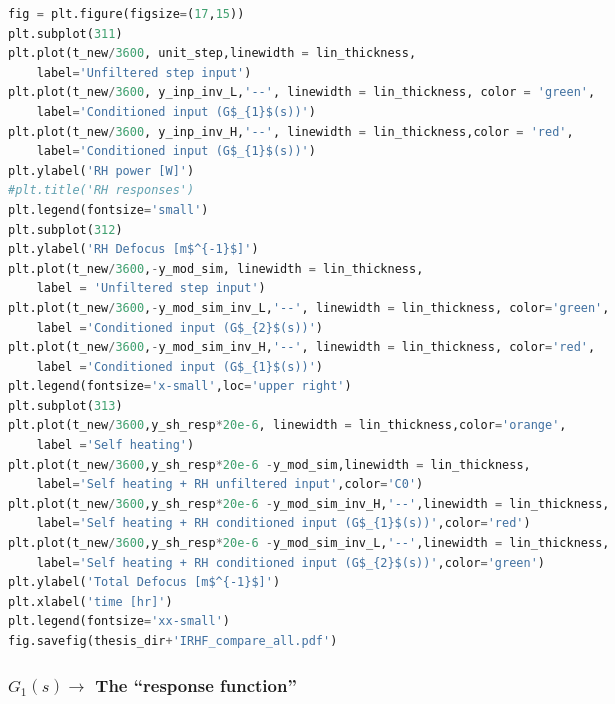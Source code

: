 
\begin{spacing}{1.2} \begin{lstlisting}[frame=single,language=Python]
fig = plt.figure(figsize=(17,15))
plt.subplot(311)
plt.plot(t_new/3600, unit_step,linewidth = lin_thickness,
    label='Unfiltered step input')
plt.plot(t_new/3600, y_inp_inv_L,'--', linewidth = lin_thickness, color = 'green',
    label='Conditioned input (G$_{1}$(s))')
plt.plot(t_new/3600, y_inp_inv_H,'--', linewidth = lin_thickness,color = 'red', 
    label='Conditioned input (G$_{1}$(s))')
plt.ylabel('RH power [W]')
#plt.title('RH responses')
plt.legend(fontsize='small')
plt.subplot(312)
plt.ylabel('RH Defocus [m$^{-1}$]')
plt.plot(t_new/3600,-y_mod_sim, linewidth = lin_thickness,
    label = 'Unfiltered step input')
plt.plot(t_new/3600,-y_mod_sim_inv_L,'--', linewidth = lin_thickness, color='green',
    label ='Conditioned input (G$_{2}$(s))')
plt.plot(t_new/3600,-y_mod_sim_inv_H,'--', linewidth = lin_thickness, color='red',
    label ='Conditioned input (G$_{1}$(s))')
plt.legend(fontsize='x-small',loc='upper right')
plt.subplot(313)
plt.plot(t_new/3600,y_sh_resp*20e-6, linewidth = lin_thickness,color='orange',
    label ='Self heating')
plt.plot(t_new/3600,y_sh_resp*20e-6 -y_mod_sim,linewidth = lin_thickness,
    label='Self heating + RH unfiltered input',color='C0')
plt.plot(t_new/3600,y_sh_resp*20e-6 -y_mod_sim_inv_H,'--',linewidth = lin_thickness,
    label='Self heating + RH conditioned input (G$_{1}$(s))',color='red')
plt.plot(t_new/3600,y_sh_resp*20e-6 -y_mod_sim_inv_L,'--',linewidth = lin_thickness,
    label='Self heating + RH conditioned input (G$_{2}$(s))',color='green')
plt.ylabel('Total Defocus [m$^{-1}$]')
plt.xlabel('time [hr]')
plt.legend(fontsize='xx-small')
fig.savefig(thesis_dir+'IRHF_compare_all.pdf')
\end{lstlisting} \end{spacing}


\subsubsection*{\texorpdfstring{$G_{1}(s) \rightarrow$}{G1s} The ``response function''}

